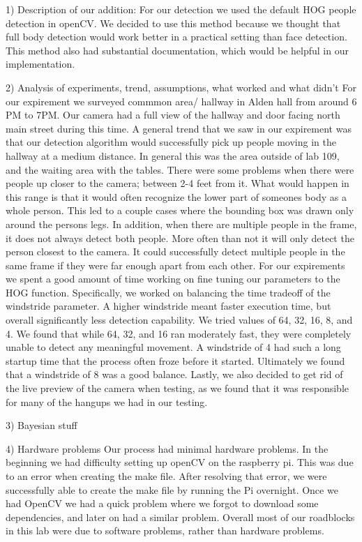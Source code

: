 1) Description of our addition:
	For our detection we used the default HOG people detection in openCV. We decided to use this method because we thought that full body detection would work better in a practical setting than face detection. This method also had substantial documentation, which would be helpful in our implementation.

2) Analysis of experiments, trend, assumptions, what worked and what didn't
For our expirement we surveyed commmon area/ hallway in Alden hall from around 6 PM to 7PM. Our camera had a full view of the hallway and door facing north main street during this time. A general trend that we saw in our expirement was that our detection algorithm would successfully pick up people moving in the hallway at a medium distance. In general this was the area outside of lab 109, and the waiting area with the tables. There were some problems when there were people up closer to the camera; between 2-4 feet from it. What would happen in this range is that it would often recognize the lower part of someones body as a whole person. This led to a couple cases where the bounding box was drawn only around the persons legs. In addition, when there are multiple people in the frame, it does not always detect both people. More often than not it will only detect the person closest to the camera. It could successfully detect multiple people in the same frame if they were far enough apart from each other. For our expirements we spent a good amount of time working on fine tuning our parameters to the HOG function. Specifically, we worked on balancing the time tradeoff of the windstride parameter. A higher windstride meant faster execution time, but overall significantly less detection capability. We tried values of 64, 32, 16, 8, and 4. We found that while 64, 32, and 16 ran moderately fast, they were completely unable to detect any meaningful movement. A windstride of 4 had such a long startup time that the process often froze before it started. Ultimately we found that a windstride of 8 was a good balance. Lastly, we also decided to get rid of the live preview of the camera when testing, as we found that it was responsible for many of the hangups we had in our testing.

3) Bayesian stuff

4) Hardware problems
Our process had minimal hardware problems. In the beginning we had difficulty setting up openCV on the raspberry pi. This was due to an error when creating the make file. After resolving that error, we were successfully able to create the make file by running the Pi overnight. Once we had OpenCV we had a quick problem where we forgot to download some dependencies, and later on had a similar problem. Overall most of our roadblocks in this lab were due to software problems, rather than hardware problems. 